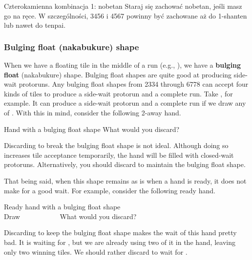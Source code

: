 \bigskip
\color{MyRed}
\begin{itembox}[c]{Czterokamienna kombinacja 1: {\jap nobetan}}
\normalcolor
Staraj się zachować {\jap nobetan}, jeśli masz go na ręce.
W szczególności, 3456 i 4567 powinny być zachowane aż do 1-{\jap shanten} lub nawet do {\jap tenpai}.
\end{itembox}
\normalcolor

\bigskip


\subsubsection{Bulging float ({\jap nakabukure}) shape}

When we have a floating tile in the middle of a run (e.g., {\LARGE{}}), we have a {\bf bulging float} ({\jap nakabukure}) shape. 
Bulging float shapes are quite good at producing side-wait protoruns. Any bulging float shapes from 2334 through 6778 can accept four kinds of tiles to produce a side-wait protorun and a complete run. Take {\LARGE{}}, for example. It can produce a side-wait protorun and a complete run if we draw any of {\LARGE{}}. 
With this in mind, consider the following 2-away hand.
\bigskip
\begin{itembox}[r]{Hand with a bulging float shape}
\bp
{}
\ep
\vspace{-10pt}What would you discard? \vspace{-5pt}
\end{itembox}
Discarding {\LARGE{}} to break the bulging float shape is not ideal. Although doing so increases tile acceptance temporarily, the hand will be filled with closed-wait protoruns. Alternatively, you should discard {\LARGE{}} to maintain the bulging float shape. 

\bigskip
That being said, when this shape remains as is when a hand is ready, it does not make for a good wait. For example, consider the following ready hand. 
\begin{itembox}[r]{Ready hand with a bulging float shape}
\bp
{}\bei\zhong\zhong\zhong~\\
\hfill\footnotesize{Draw~~~~~~~~~~~}
\ep 
\vspace{-15pt}What would you discard? \vspace{-5pt}
\end{itembox}
\noindent
Discarding {\LARGE\bei} to keep the bulging float shape {\LARGE{}} makes the wait of this hand pretty bad. It is waiting for {\LARGE{}}, but we are already using two of it in the hand, leaving only two winning tiles. We should rather discard {\LARGE{}} to wait for {\LARGE\bei}. 

